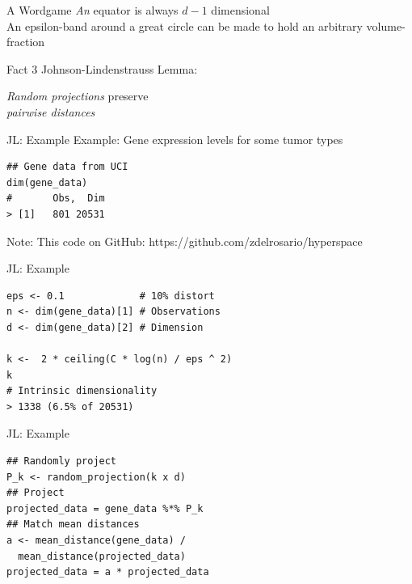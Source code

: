 \documentclass[14pt]{beamer}
\begin{document}
\begin{frame}{A Wordgame}
  \emph{An} equator is always $d-1$ dimensional \\

  \bigskip An epsilon-band around a great circle can be made to hold an
  arbitrary volume-fraction
\end{frame}


\begin{frame}{Fact 3}
  Johnson-Lindenstrauss Lemma:

  \bigskip \emph{Random projections} preserve \\
  \emph{pairwise distances}
\end{frame}

\begin{frame}[fragile]{JL: Example}
Example: Gene expression levels for some tumor types

\bigskip
  \begin{lstlisting}
## Gene data from UCI
dim(gene_data)
#       Obs,  Dim
> [1]   801 20531
  \end{lstlisting}

  \bigskip
  Note: This code on GitHub: https://github.com/zdelrosario/hyperspace
\end{frame}

\begin{frame}[fragile]{JL: Example}
  \begin{lstlisting}
eps <- 0.1             # 10% distort
n <- dim(gene_data)[1] # Observations
d <- dim(gene_data)[2] # Dimension

k <-  2 * ceiling(C * log(n) / eps ^ 2)
k
# Intrinsic dimensionality
> 1338 (6.5% of 20531)
  \end{lstlisting}
\end{frame}

\begin{frame}[fragile]{JL: Example}
  \begin{lstlisting}
## Randomly project
P_k <- random_projection(k x d)
## Project
projected_data = gene_data %*% P_k
## Match mean distances
a <- mean_distance(gene_data) /
  mean_distance(projected_data)
projected_data = a * projected_data
  \end{lstlisting}
\end{frame}
\end{document}
